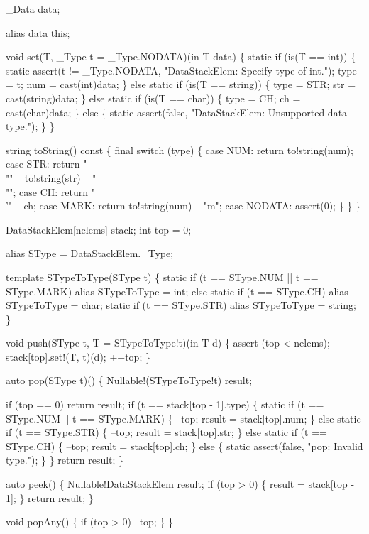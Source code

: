    _Data data;
  
    alias data this;
    
    void set(T, _Type t = _Type.NODATA)(in T data) \{
      static if (is(T == int)) \{
        static assert(t != _Type.NODATA,
          "DataStackElem: Specify type of int.");
        type = t;
        num  = cast(int)data;
      \} else static if (is(T == string)) \{
        type = STR;
        str = cast(string)data;
      \} else static if (is(T == char)) \{
        type = CH;
        ch = cast(char)data;
      \} else \{
        static assert(false,
          "DataStackElem: Unsupported data type.");
      \}
    \}

    string toString() const \{
      final switch (type) \{
      case NUM:    return to!string(num);
      case STR:    return "\\"" ~ to!string(str) ~ "\\"";
      case CH:     return "\\'" ~ ch;
      case MARK:   return to!string(num) ~ "m";
      case NODATA: assert(0);
      \}
    \}
  \}

  DataStackElem[nelems] stack;
  int top = 0;

  alias SType = DataStackElem._Type;

  template STypeToType(SType t) \{
    static if (t == SType.NUM || t == SType.MARK)
      alias STypeToType = int;
    else static if (t == SType.CH)
      alias STypeToType = char;
    static if (t == SType.STR)
      alias STypeToType = string;
  \}

  void push(SType t, T = STypeToType!t)(in T d)
  \{
    assert (top < nelems);
    stack[top].set!(T, t)(d);
    ++top;
  \}

  auto pop(SType t)()
  \{
    Nullable!(STypeToType!t) result;

    if (top == 0) return result;
    if (t == stack[top - 1].type) \{
      static if (t == SType.NUM ||
                 t == SType.MARK) \{
        --top;
        result = stack[top].num;
      \} else static if (t == SType.STR) \{
        --top;
        result = stack[top].str;
      \} else static if (t == SType.CH) \{
        --top;
        result = stack[top].ch;
      \} else \{
        static assert(false, "pop: Invalid type.");
      \}
    \}
    return result;
  \}

  auto peek()
  \{
    Nullable!DataStackElem result;
    if (top > 0) \{
      result = stack[top - 1];
    \}
    return result;
  \}

  void popAny()
  \{
    if (top > 0) --top;
  \}
\}

